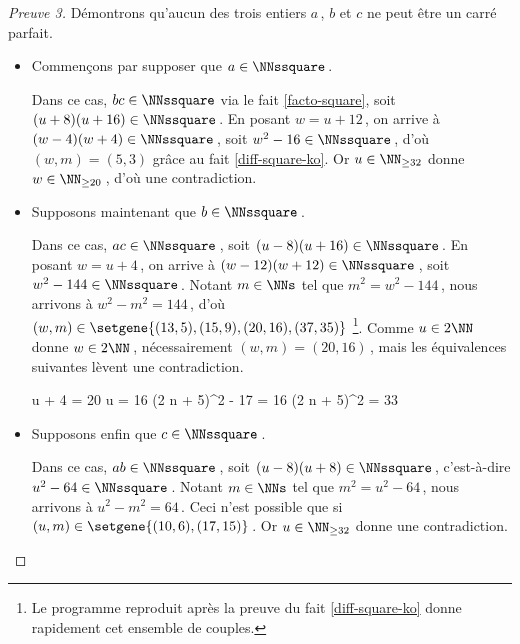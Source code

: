 \begin{proof}[Preuve 3]
	\medskip
	
	Démontrons qu'aucun des trois entiers $a$\,, $b$ et $c$ ne peut être un carré parfait.
	\begin{itemize}
		\medskip
		\item Commençons par supposer que $a \in \NNssquare$\,. 
		
		\smallskip
		\noindent
		Dans ce cas, $bc \in \NNssquare$ via le fait \ref{facto-square}, soit $(u + 8) (u + 16) \in \NNssquare$\,.
		En posant $w = u + 12$\,, on arrive à $(w - 4) (w + 4) \in \NNssquare$\,, soit $w^2 - 16 \in \NNssquare$\,, d'où $(w, m) = (5, 3)$ grâce au fait \ref{diff-square-ko}.
		Or $u \in \NN_{\geq 32}$ donne $w \in \NN_{\geq 20}$\,, d'où une contradiction.

		
		\medskip
		\item Supposons maintenant que $b \in \NNssquare$\,.
		
		\smallskip
		\noindent
		Dans ce cas, $ac \in \NNssquare$\,, soit $(u - 8) (u + 16) \in \NNssquare$\,.
		En posant $w = u + 4$\,, on arrive à $(w - 12) (w + 12) \in \NNssquare$\,, soit $w^2 - 144 \in \NNssquare$\,.
		Notant $m \in \NNs$ tel que $m^2 = w^2 - 144$\,, nous arrivons à $w^2 - m^2 = 144$\,, d'où $(w, m) \in \setgene{(13, 5) , (15, 9) , (20, 16) , (37, 35)}$
		\footnote{
			Le programme reproduit après la preuve du fait \ref{diff-square-ko} donne rapidement cet ensemble de couples.
		}.
		Comme $u \in 2 \NN$ donne $w \in 2 \NN$\,, nécessairement $(w, m) = (20, 16)$\,, mais les équivalences suivantes lèvent une contradiction.

		\noindent\!\!%
   		\begin{stepcalc}[style = sar, ope = \iff]
			u + 4 = 20
		\explnext{}
			u = 16
		\explnext{}
			(2 n + 5)^2 - 17 = 16
		\explnext*{$33 \notin \NNsquare$}{}
			(2 n + 5)^2 = 33
		\end{stepcalc}	
		
		
		\medskip
		\item Supposons enfin que $c \in \NNssquare$\,.
		
		\smallskip
		\noindent
		Dans ce cas, $ab \in \NNssquare$\,, soit $(u - 8) (u + 8) \in \NNssquare$\,, c'est-à-dire $u^2 - 64 \in \NNssquare$\,.
		Notant $m \in \NNs$ tel que $m^2 = u^2 - 64$\,, nous arrivons à $u^2 - m^2 = 64$\,.
		Ceci n'est possible que si $(u, m) \in \setgene{(10, 6), (17, 15)}$\,.
		Or $u \in \NN_{\geq 32}$ donne une contradiction.
	\end{itemize}

	\medskip


\end{proof}
